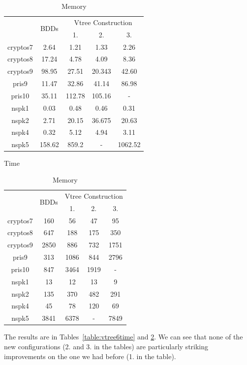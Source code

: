 \documentclass[11pt]{report}
\begin{document}
\begin{table}
\centering
\begin{tabular}{|*{5}{c|}}
\hline
& \multirow{2}{*}{BDDs} & \multicolumn{3}{c|}{Vtree Construction} \\ \cline{3-5}
& & 1. & 2. & 3.\\ \hline
cryptos7 & 2.64 &  1.21& 1.33 & 2.26 \\\hline
cryptos8 & 17.24&  4.78& 4.09 & 8.36 \\\hline
cryptos9 & 98.95 &27.51 & 20.343 & 42.60 \\\hline
pris9 & 11.47&32.86 & 41.14 & 86.98\\\hline
pris10 & 35.11&112.78& 105.16 & -\\\hline
nspk1 & 0.03 &0.48  & 0.46 & 0.31 \\\hline
nspk2 & 2.71 &  20.15& 36.675 & 20.63 \\\hline
nspk4 & 0.32 & 5.12& 4.94 & 3.11 \\\hline
nspk5 & 158.62 &859.2 & - & 1062.52\\\hline
\end{tabular}
\caption{Time}
\label{table:vtree6time}
\vspace{1in}
\begin{tabular}{|*{5}{c|}}
\hline
& \multirow{2}{*}{BDDs} & \multicolumn{3}{c|}{Vtree Construction} \\  \cline{3-5}
& & 1. & 2. & 3.\\ \hline
cryptos7 & 160 & 56 & 47 & 95 \\\hline
cryptos8 & 647 & 188 & 175& 350 \\\hline
cryptos9 & 2850 & 886 & 732 & 1751 \\\hline
pris9 & 313 & 1086 & 844& 2796 \\\hline
pris10 & 847 & 3464 & 1919 & - \\\hline
nspk1 & 13 & 12& 13 & 9 \\\hline
nspk2 & 135 & 370 & 482 & 291 \\\hline
nspk4 & 45 & 78  & 120 & 69 \\\hline
nspk5 & 3841 & 6378 & - & 7849 \\\hline
\end{tabular}
\caption{Memory}
\label{table:vtree6memory}
\end{table}

The results are in Tables~\ref{table:vtree6time} and \ref{table:vtree6memory}. We can see that none of the new configurations (2. and 3. in the tables) are particularly striking improvements on the one we had before (1. in the table). 
\end{document}
